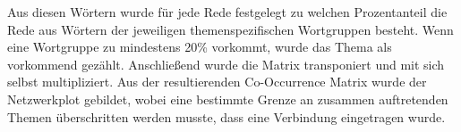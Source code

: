 Aus diesen Wörtern wurde für jede Rede festgelegt zu welchen Prozentanteil die Rede aus Wörtern der jeweiligen themenspezifischen Wortgruppen besteht. Wenn eine Wortgruppe zu mindestens 20\% vorkommt, wurde das Thema als vorkommend gezählt. Anschließend wurde die Matrix transponiert und mit sich selbst multipliziert. Aus der resultierenden Co-Occurrence Matrix wurde der Netzwerkplot gebildet, wobei eine bestimmte Grenze an zusammen auftretenden Themen überschritten werden musste, dass eine Verbindung eingetragen wurde.   

\begin{center}
\begin{figure} [H]
\end{figure}

\begin{figure} [H]
\end{figure}
\end{center}


